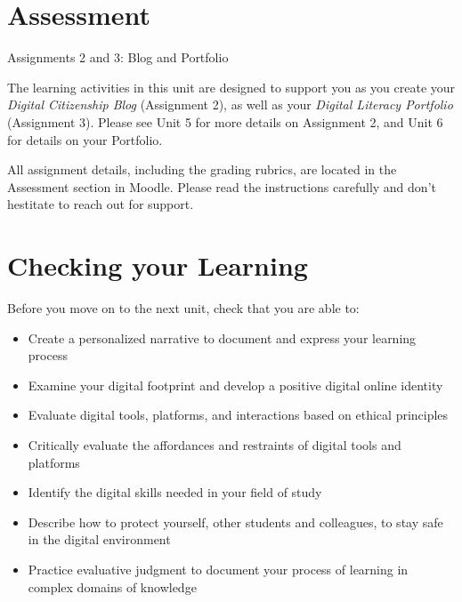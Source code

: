 \documentclass[
]{book}
\providecommand{\tightlist}{%
  \setlength{\itemsep}{0pt}\setlength{\parskip}{0pt}}
\theoremstyle{definition}
\theoremstyle{definition}
\theoremstyle{definition}
\theoremstyle{definition}
\theoremstyle{remark}
\begin{document}
\hypertarget{assessment-1}{%
\section*{Assessment}\label{assessment-1}}

\begin{assessment}
{Assignments 2 and 3: Blog and Portfolio}

The learning activities in this unit are designed to support you as you create your \emph{Digital Citizenship Blog} (Assignment 2), as well as your \emph{Digital Literacy Portfolio} (Assignment 3). Please see Unit 5 for more details on Assignment 2, and Unit 6 for details on your Portfolio.

All assignment details, including the grading rubrics, are located in the Assessment section in Moodle. Please read the instructions carefully and don't hestitate to reach out for support.
\end{assessment}

\hypertarget{checking-your-learning-3}{%
\section*{Checking your Learning}\label{checking-your-learning-3}}

\begin{progress}
Before you move on to the next unit, check that you are able to:

\begin{itemize}
\tightlist
\item
  Create a personalized narrative to document and express your learning process\\
\item
  Examine your digital footprint and develop a positive digital online identity\\
\item
  Evaluate digital tools, platforms, and interactions based on ethical principles\\
\item
  Critically evaluate the affordances and restraints of digital tools and platforms\\
\item
  Identify the digital skills needed in your field of study\\
\item
  Describe how to protect yourself, other students and colleagues, to stay safe in the digital environment\\
\item
  Practice evaluative judgment to document your process of learning in complex domains of knowledge
\end{itemize}
\end{progress}
\end{document}
